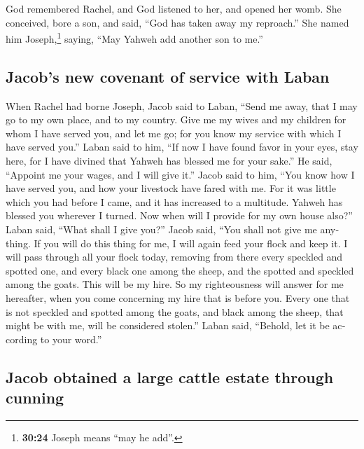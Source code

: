 \begin{paracol}{2}
\begin{otherlanguage}{english}
 God remembered Rachel, and God listened to her, and
opened her womb.  She conceived, bore a son, and said,
``God has taken away my reproach.''  She named him
Joseph,\footnote{\textbf{30:24} Joseph means ``may he add''.} saying,
``May Yahweh add another son to me.''

\hypertarget{jacobs-new-covenant-of-service-with-laban}{%
\subsection{Jacob's new covenant of service with
Laban}\label{jacobs-new-covenant-of-service-with-laban}}

 When Rachel had borne Joseph, Jacob said to Laban,
``Send me away, that I may go to my own place, and to my country.
 Give me my wives and my children for whom I have served
you, and let me go; for you know my service with which I have served
you.''  Laban said to him, ``If now I have found favor in
your eyes, stay here, for I have divined that Yahweh has blessed me for
your sake.''  He said, ``Appoint me your wages, and I
will give it.''  Jacob said to him, ``You know how I have
served you, and how your livestock have fared with me. 
For it was little which you had before I came, and it has increased to a
multitude. Yahweh has blessed you wherever I turned. Now when will I
provide for my own house also?''  Laban said, ``What
shall I give you?'' Jacob said, ``You shall not give me anything. If you
will do this thing for me, I will again feed your flock and keep it.
 I will pass through all your flock today, removing from
there every speckled and spotted one, and every black one among the
sheep, and the spotted and speckled among the goats. This will be my
hire.  So my righteousness will answer for me hereafter,
when you come concerning my hire that is before you. Every one that is
not speckled and spotted among the goats, and black among the sheep,
that might be with me, will be considered stolen.'' 
Laban said, ``Behold, let it be according to your word.''

\hypertarget{jacob-obtained-a-large-cattle-estate-through-cunning}{%
\subsection{Jacob obtained a large cattle estate through
cunning}\label{jacob-obtained-a-large-cattle-estate-through-cunning}}


\end{otherlanguage}
\end{paracol}
